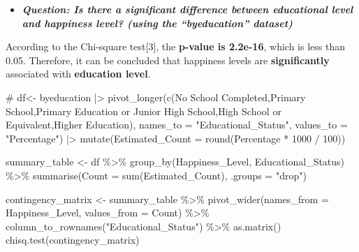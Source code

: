 \documentclass[
  11pt,
  a4paper,
  DIV=11,
  numbers=noendperiod]{scrartcl}
\newenvironment{Shaded}{\begin{snugshade}}{\end{snugshade}}
\newcommand{\AttributeTok}[1]{\textcolor[rgb]{0.40,0.45,0.13}{#1}}
\newcommand{\CommentTok}[1]{\textcolor[rgb]{0.37,0.37,0.37}{#1}}
\newcommand{\DecValTok}[1]{\textcolor[rgb]{0.68,0.00,0.00}{#1}}
\newcommand{\FunctionTok}[1]{\textcolor[rgb]{0.28,0.35,0.67}{#1}}
\newcommand{\NormalTok}[1]{\textcolor[rgb]{0.00,0.23,0.31}{#1}}
\newcommand{\OtherTok}[1]{\textcolor[rgb]{0.00,0.23,0.31}{#1}}
\newcommand{\SpecialCharTok}[1]{\textcolor[rgb]{0.37,0.37,0.37}{#1}}
\newcommand{\StringTok}[1]{\textcolor[rgb]{0.13,0.47,0.30}{#1}}
\providecommand{\tightlist}{%
  \setlength{\itemsep}{0pt}\setlength{\parskip}{0pt}}\usepackage{longtable,booktabs,array}
\begin{document}
\begin{itemize}
\tightlist
\item
  {\textbf{\emph{Question: Is there a significant difference between
  educational level and happiness level? (using the ``byeducation''
  dataset)}}}
\end{itemize}

According to the Chi-square test{[}3{]}, the {\textbf{p-value is
2.2e-16}}, which is less than 0.05. Therefore, it can be concluded that
happiness levels are {\textbf{significantly}} associated with
{\textbf{education level}}.

\begin{Shaded}
\begin{Highlighting}[]
\CommentTok{\#}
\NormalTok{df}\OtherTok{\textless{}{-}}\NormalTok{ byeducation }\SpecialCharTok{|\textgreater{}} \FunctionTok{pivot\_longer}\NormalTok{(}\FunctionTok{c}\NormalTok{(}\StringTok{\textasciigrave{}}\AttributeTok{No School Completed}\StringTok{\textasciigrave{}}\NormalTok{,}\StringTok{\textasciigrave{}}\AttributeTok{Primary School}\StringTok{\textasciigrave{}}\NormalTok{,}\StringTok{\textasciigrave{}}\AttributeTok{Primary Education or Junior High School}\StringTok{\textasciigrave{}}\NormalTok{,}\StringTok{\textasciigrave{}}\AttributeTok{High School or Equivalent}\StringTok{\textasciigrave{}}\NormalTok{,}\StringTok{\textasciigrave{}}\AttributeTok{Higher Education}\StringTok{\textasciigrave{}}\NormalTok{),}
               \AttributeTok{names\_to  =} \StringTok{"Educational\_Status"}\NormalTok{,}
               \AttributeTok{values\_to =} \StringTok{"Percentage"}\NormalTok{) }\SpecialCharTok{|\textgreater{}}
 \FunctionTok{mutate}\NormalTok{(}\AttributeTok{Estimated\_Count =} \FunctionTok{round}\NormalTok{(Percentage }\SpecialCharTok{*} \DecValTok{1000} \SpecialCharTok{/} \DecValTok{100}\NormalTok{))}
 

\NormalTok{summary\_table }\OtherTok{\textless{}{-}}\NormalTok{ df }\SpecialCharTok{\%\textgreater{}\%}
  \FunctionTok{group\_by}\NormalTok{(Happiness\_Level, Educational\_Status) }\SpecialCharTok{\%\textgreater{}\%}
  \FunctionTok{summarise}\NormalTok{(}\AttributeTok{Count =} \FunctionTok{sum}\NormalTok{(Estimated\_Count), }\AttributeTok{.groups =} \StringTok{"drop"}\NormalTok{)}

\NormalTok{contingency\_matrix }\OtherTok{\textless{}{-}}\NormalTok{ summary\_table }\SpecialCharTok{\%\textgreater{}\%}
  \FunctionTok{pivot\_wider}\NormalTok{(}\AttributeTok{names\_from =}\NormalTok{ Happiness\_Level, }\AttributeTok{values\_from =}\NormalTok{ Count) }\SpecialCharTok{\%\textgreater{}\%}
  \FunctionTok{column\_to\_rownames}\NormalTok{(}\StringTok{"Educational\_Status"}\NormalTok{) }\SpecialCharTok{\%\textgreater{}\%}
  \FunctionTok{as.matrix}\NormalTok{()}
\FunctionTok{chisq.test}\NormalTok{(contingency\_matrix)}
\end{Highlighting}
\end{Shaded}
\end{document}
